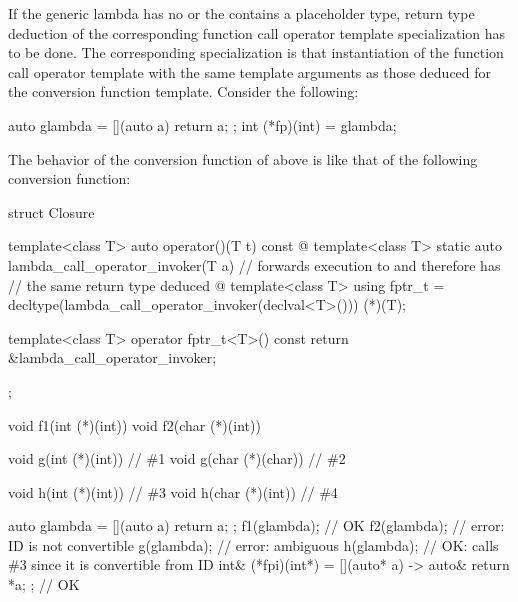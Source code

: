 \pnum
\begin{note}
If the generic lambda has no  or
the  contains a placeholder type, return type
deduction of the corresponding function call operator template specialization
has to be done. The corresponding specialization is that instantiation of the
function call operator template with the same template arguments as those
deduced for the conversion function template.  Consider the following:
\begin{codeblock}
auto glambda = [](auto a) { return a; };
int (*fp)(int) = glambda;
\end{codeblock}
The behavior of the conversion function of  above is like
that of the following conversion function:
\begin{codeblock}
struct Closure {
  template<class T> auto operator()(T t) const { @\commentellip@ }
  template<class T> static auto lambda_call_operator_invoker(T a) {
    // forwards execution to  and therefore has
    // the same return type deduced
    @\commentellip@
  }
  template<class T> using fptr_t =
     decltype(lambda_call_operator_invoker(declval<T>())) (*)(T);

  template<class T> operator fptr_t<T>() const
    { return &lambda_call_operator_invoker; }
};
\end{codeblock}
\end{note}

\begin{example}
\begin{codeblock}
void f1(int (*)(int))   { }
void f2(char (*)(int))  { }

void g(int (*)(int))    { }     // \#1
void g(char (*)(char))  { }     // \#2

void h(int (*)(int))    { }     // \#3
void h(char (*)(int))   { }     // \#4

auto glambda = [](auto a) { return a; };
f1(glambda);                    // OK
f2(glambda);                    // error: ID is not convertible
g(glambda);                     // error: ambiguous
h(glambda);                     // OK: calls \#3 since it is convertible from ID
int& (*fpi)(int*) = [](auto* a) -> auto& { return *a; };        // OK
\end{codeblock}
\end{example}

